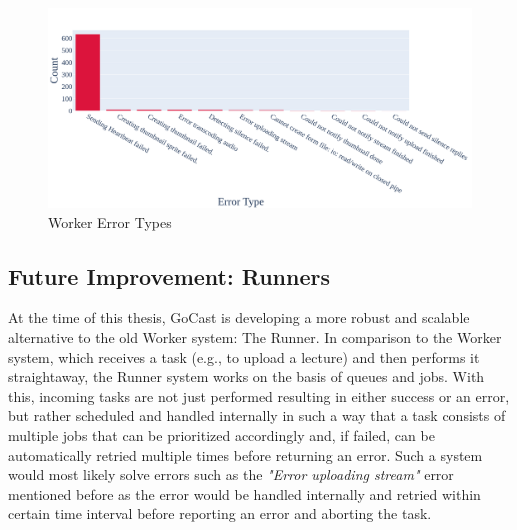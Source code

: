 \begin{figure}[htpb]
    \centering
    \includegraphics[width=\linewidth]{images/plots/worker/error_types.png}
    \caption[Worker Error Types]{Worker Error Types}\label{fig:worker-error-types}
\end{figure}

\subsection{Future Improvement: Runners}

At the time of this thesis, GoCast is developing a more robust and scalable alternative to the old Worker system: The Runner. In comparison to the Worker system, which receives a task (e.g., to upload a lecture) and then performs it straightaway, the Runner system works on the basis of queues and jobs. With this, incoming tasks are not just performed resulting in either success or an error, but rather scheduled and handled internally in such a way that a task consists of multiple jobs that can be prioritized accordingly and, if failed, can be automatically retried multiple times before returning an error. Such a system would most likely solve errors such as the \textit{"Error uploading stream"} error mentioned before as the error would be handled internally and retried within certain time interval before reporting an error and aborting the task.



